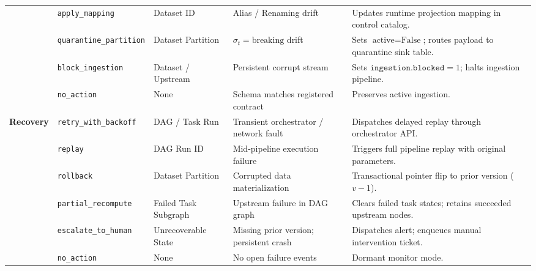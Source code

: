 \begin{table}[!t]
\begin{tabularx}{\textwidth}{l p{2.8cm} p{2.8cm} p{3.2cm} X}
& \texttt{apply\_mapping} & Dataset ID & Alias / Renaming drift & Updates runtime projection mapping in control catalog. \\
& \texttt{quarantine\_partition} & Dataset Partition & $\sigma_t = \text{breaking}$ drift & Sets $\text{active}=\text{False}$; routes payload to quarantine sink table. \\
& \texttt{block\_ingestion} & Dataset / Upstream & Persistent corrupt stream & Sets $\texttt{ingestion.blocked}=1$; halts ingestion pipeline. \\
& \texttt{no\_action} & None & Schema matches registered contract & Preserves active ingestion. \\
\midrule
\multirow{6}{*}{\textbf{Recovery}} 
& \texttt{retry\_with\_backoff} & DAG / Task Run & Transient orchestrator / network fault & Dispatches delayed replay through orchestrator API. \\
& \texttt{replay} & DAG Run ID & Mid-pipeline execution failure & Triggers full pipeline replay with original parameters. \\
& \texttt{rollback} & Dataset Partition & Corrupted data materialization & Transactional pointer flip to prior version ($v - 1$). \\
& \texttt{partial\_recompute} & Failed Task Subgraph & Upstream failure in DAG graph & Clears failed task states; retains succeeded upstream nodes. \\
& \texttt{escalate\_to\_human} & Unrecoverable State & Missing prior version; persistent crash & Dispatches alert; enqueues manual intervention ticket. \\
& \texttt{no\_action} & None & No open failure events & Dormant monitor mode. \\
\bottomrule
\end{tabularx}
\end{table}

